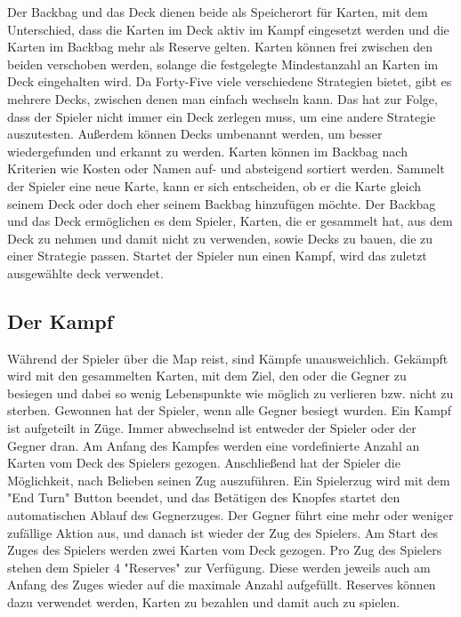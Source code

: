 Der Backbag und das Deck dienen beide als Speicherort für Karten, mit dem Unterschied, dass die Karten im Deck aktiv im
Kampf eingesetzt werden und die Karten im Backbag mehr als Reserve gelten.
Karten können frei zwischen den beiden verschoben werden, solange die festgelegte Mindestanzahl an Karten im Deck eingehalten wird.
Da Forty-Five viele verschiedene Strategien bietet, gibt es mehrere Decks, zwischen denen man einfach wechseln kann.
Das hat zur Folge, dass der Spieler nicht immer ein Deck zerlegen muss, um eine andere Strategie auszutesten.
Außerdem können Decks umbenannt werden, um besser wiedergefunden und erkannt zu werden.
Karten können im Backbag nach Kriterien wie Kosten oder Namen auf- und absteigend sortiert werden.
Sammelt der Spieler eine neue Karte, kann er sich entscheiden, ob er die Karte gleich seinem Deck oder doch eher seinem
Backbag hinzufügen möchte.
Der Backbag und das Deck ermöglichen es dem Spieler, Karten, die er gesammelt hat, aus dem Deck zu nehmen und damit
nicht zu verwenden, sowie Decks zu bauen, die zu einer Strategie passen.
Startet der Spieler nun einen Kampf, wird das zuletzt ausgewählte deck verwendet.


\subsection{Der Kampf}\label{backpack_and_deck}

Während der Spieler über die Map reist, sind Kämpfe unausweichlich.
Gekämpft wird mit den gesammelten Karten, mit dem Ziel, den oder die Gegner zu besiegen und dabei so wenig Lebenspunkte
wie möglich zu verlieren bzw. nicht zu sterben. Gewonnen hat der Spieler, wenn alle Gegner besiegt wurden.
Ein Kampf ist aufgeteilt in Züge. Immer abwechselnd ist entweder der Spieler oder der Gegner dran. Am Anfang des Kampfes
werden eine vordefinierte Anzahl an Karten vom Deck des Spielers gezogen. %
Anschließend hat der Spieler die Möglichkeit, nach Belieben seinen Zug auszuführen. Ein Spielerzug wird mit dem "End Turn"
Button beendet, und das Betätigen des Knopfes startet den automatischen Ablauf des Gegnerzuges. Der Gegner führt eine mehr oder weniger zufällige Aktion aus, und danach ist wieder der Zug des Spielers.
Am Start des Zuges des Spielers werden zwei Karten vom Deck gezogen. Pro Zug des Spielers stehen dem Spieler 4 "Reserves"
zur Verfügung. Diese werden jeweils auch am Anfang des Zuges wieder auf die maximale Anzahl aufgefüllt.
Reserves können dazu verwendet werden, Karten zu bezahlen und damit auch zu spielen.


